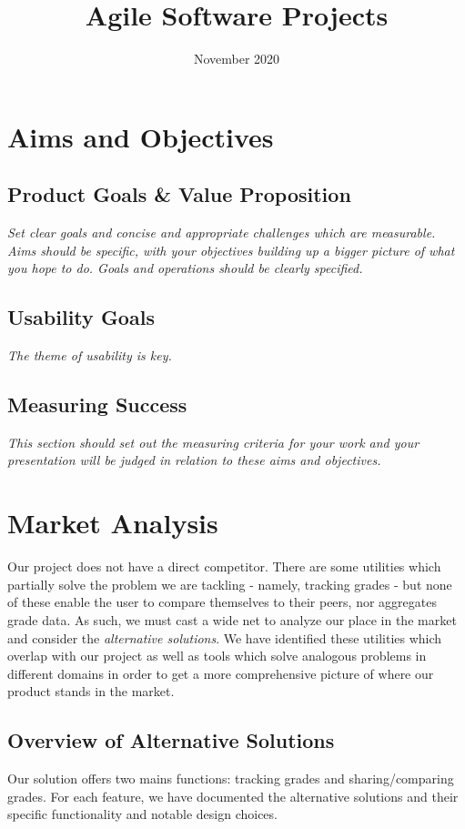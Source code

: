 \documentclass{article}
\title{Agile Software Projects}
\author{}
\date{November 2020}
\begin{document}
\maketitle
\tableofcontents
\listoffigures
\newpage

\section{Aims and Objectives}
\subsection{Product Goals \& Value Proposition}
\emph{Set clear goals and concise and appropriate challenges which are measurable. Aims should be specific, with your objectives building up a bigger picture of what you hope to do. Goals and operations should be clearly specified.}

\subsection{Usability Goals}
\textit{The theme of usability is key.}

\subsection{Measuring Success}
\textit{This section should set out the measuring criteria for your work and your presentation will be judged in relation to these aims and objectives.}

\section{Market Analysis}
Our project does not have a direct competitor. There are some utilities which partially solve the problem we are tackling - namely, tracking grades - but none of these enable the user to compare themselves to their peers, nor aggregates grade data. As such, we must cast a wide net to analyze our place in the market and consider the \textit{alternative solutions}. We have identified these utilities which overlap with our project as well as tools which solve analogous problems in different domains in order to get a more comprehensive picture of where our product stands in the market.
\subsection{Overview of Alternative Solutions}
Our solution offers two mains functions: tracking grades and sharing/comparing grades. For each feature, we have documented the alternative solutions and their specific functionality and notable design choices.
\end{document}
